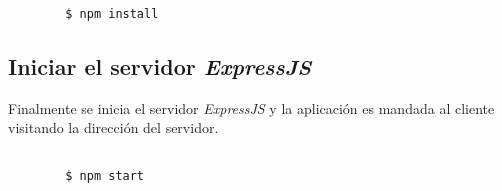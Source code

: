 \begin{center}
  \begin{lstlisting}[label=npm_install,caption=Instalar dependencias de la aplicación.]

        $ npm install
  \end{lstlisting}
\end{center}

\subsection{Iniciar el servidor \emph{ExpressJS}}

Finalmente se inicia el servidor \emph{ExpressJS} y la aplicación es mandada al cliente visitando la dirección del servidor.

\begin{center}
  \begin{lstlisting}[label=npm_start,caption=Iniciar el servidor.]

        $ npm start
  \end{lstlisting}
\end{center}
